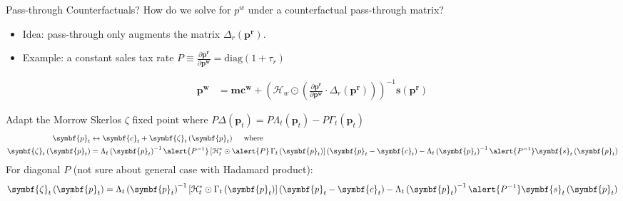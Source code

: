 \documentclass[aspectratio=169,11pt]{beamer}
\begin{document}
\begin{frame}{Pass-through Counterfactuals?}
\footnotesize
How do we solve for $p^w$ under a counterfactual pass-through matrix?
\begin{itemize}
\item Idea: pass-through only augments the matrix $\Delta_r(\symbf{p^r})$.
\item Example: a constant sales tax rate $P \equiv \frac{\partial \symbf{p^r}}{\partial \symbf{p^w}} = \text{diag}(1+\tau_r)$
\end{itemize}
\begin{align*}
\symbf{p^w}  &= \symbf{mc^w} + \left(\mathcal{H}_{w} \odot \left( \frac{\partial \symbf{p^r}}{\partial \symbf{p^w}} \cdot  \Delta_r(\symbf{p^r} ) \right) \right)^{-1} \symbf{s}(\symbf{p^r})
\end{align*}

Adapt the Morrow Skerlos $\zeta$ fixed point where $P \Delta(\symbf{p}_t) = P \Lambda_t\left(\symbf{p}_t\right)- P \Gamma_t\left(\symbf{p}_t\right)$
\begin{align*}
\symbf{p}_t &\leftrightarrow \symbf{c}_t+\symbf{\zeta}_t\left(\symbf{p}_t\right) \quad \text { where }\\
 \symbf{\zeta}_t\left(\symbf{p}_t\right)&=\Lambda_t\left(\symbf{p}_t\right)^{-1} \alert{P^{-1}}\left[\mathcal{H}_t^* \odot \alert{P}\, \Gamma_t\left(\symbf{p}_t\right)\right]\left(\symbf{p}_t-\symbf{c}_t\right)-\Lambda_t\left(\symbf{p}_t\right)^{-1} \alert{P^{-1}} \symbf{s}_t\left(\symbf{p}_t\right)
\end{align*}
For diagonal $P$ (not sure about general case with Hadamard product):
\begin{align*}
 \symbf{\zeta}_t\left(\symbf{p}_t\right)=\Lambda_t\left(\symbf{p}_t\right)^{-1}\left[\mathcal{H}_t^* \odot  \Gamma_t\left(\symbf{p}_t\right)\right]\left(\symbf{p}_t-\symbf{c}_t\right)-\Lambda_t\left(\symbf{p}_t\right)^{-1} \alert{P^{-1}} \symbf{s}_t\left(\symbf{p}_t\right)
\end{align*}
 
\end{frame}
\end{document}
